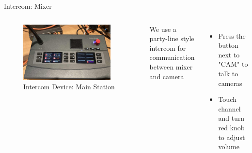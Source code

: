 \begin{frame}{Intercom: Mixer}
	\begin{columns}[T,onlytextwidth]
		\begin{figure}
			\centering
			\includegraphics[width=0.9\textwidth]{images/intercom-riedel-panel.jpg}
			\caption{Intercom Device: Main Station}
		\end{figure}
			We use a party-line style intercom for communication between mixer and camera
		\begin{itemize}
			\item Press the button next to "CAM" to talk to cameras
			\item Touch channel and turn red knob to adjust volume
		\end{itemize}
	\end{columns}
\end{frame}

